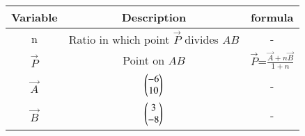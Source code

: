 \begin{tabular}[12pt]{ |c|c|c|}
\hline
\textbf{Variable} & \textbf{Description} & \textbf{formula}\\ 
\hline
n & Ratio in which point $\vec{P}$ divides $AB$ & - \\
\hline 
$\vec{P}$ & Point on $AB$ & $\vec{P}$=$\frac{\vec{A} + n\vec{B}}{1+n}$\\
\hline
$\vec{A}$ & $\begin{pmatrix}-6 \\ 10\end{pmatrix}$ & -\\
\hline
$\vec{B}$ & $\begin{pmatrix}3 \\ -8\end{pmatrix}$ & -\\
\hline   
\end{tabular}

